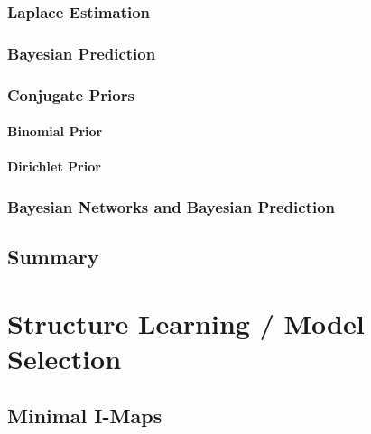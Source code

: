 			\subsubsection{Laplace Estimation} %

			\subsubsection{Bayesian Prediction} %

			\subsubsection{Conjugate Priors} %

				\paragraph{Binomial Prior} %

				\paragraph{Dirichlet Prior} %

			\subsubsection{Bayesian Networks and Bayesian Prediction} %

		\subsection{Summary} %

	\section{Structure Learning / Model Selection} %

		\subsection{Minimal I-Maps} %

